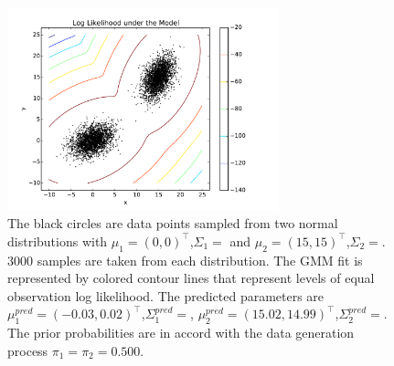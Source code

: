 \begin{figure}
    \centering
    \includegraphics[width=0.7\textwidth]{images/gmm/gmm_example.pdf}
    \caption[GMM example]{\protect The black circles are data points sampled from two normal distributions with
        $\mu_1=(0,0)^\intercal$,$\Sigma_1=$\usebox{\covmatfirst} and
        $\mu_2=(15,15)^\intercal$,$\Sigma_2=$\protect\usebox{\covmatsecond}. 3000 samples are taken from
        each distribution. The GMM fit is represented by colored contour lines that represent levels
        of equal observation log likelihood. The predicted parameters are $\mu_1^{pred}=(-0.03,
        0.02)^\intercal$,$\Sigma_1^{pred}=$\protect\usebox{\predmatfirst}, $\mu_2^{pred}=(15.02,
        14.99)^\intercal$,$\Sigma_2^{pred}=$\protect\usebox{\predmatsecond}. The prior probabilities are in
        accord with the data generation process $\pi_1 = \pi_2 =
        0.500$.}
    \label{fig:gmm-example}
\end{figure}

